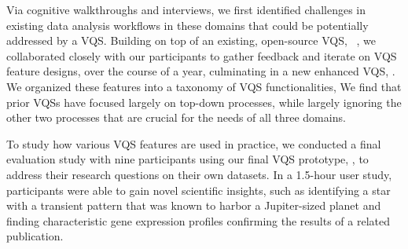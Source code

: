 \par Via cognitive walkthroughs and interviews, we first identified challenges in existing data analysis workflows in these domains
that could be potentially addressed by a VQS. Building on top of an existing, open-source VQS, \zv~\cite{Siddiqui2017,Siddiqui2017VLDB}, we collaborated closely with our participants to gather feedback and iterate on VQS feature designs,
over the course of a year, culminating in a new enhanced VQS, \zvpp. We organized these features into a taxonomy of VQS functionalities,   We find that prior VQSs have focused largely on top-down processes, while largely ignoring the other two processes that are crucial for the needs of all three domains.

\par 
To study how various VQS features 
are used in practice, 
we conducted a final evaluation study with nine participants 
using our final VQS prototype, \zvpp, 
to address their research questions 
on their own datasets. 
In a 1.5-hour user study, participants were able to 
gain novel scientific insights, 
such as identifying a star with a transient pattern 
that was known to harbor a Jupiter-sized planet 
and finding characteristic gene expression profiles confirming the results of a related publication.  

